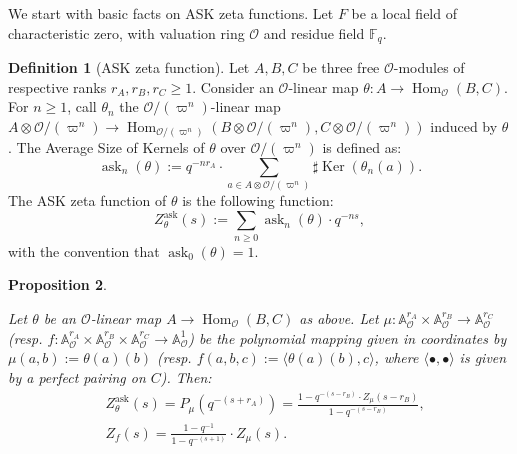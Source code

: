 \documentclass[11pt,english]{article}
\numberwithin{equation}{section}
\numberwithin{figure}{section}
\theoremstyle{definition}
\newtheorem{df}{Definition}[subsection]
\theoremstyle{plain}
\newtheorem{prop}[df]{Proposition}
\theoremstyle{remark}
\DeclareMathOperator{\Ker}{Ker}
\DeclareMathOperator{\Hom}{Hom}
\DeclareMathOperator{\ask}{ask}
\newcommand\FF{\mathbb{F}}
\begin{document}
We start with basic facts on ASK zeta functions. Let $F$ be a local
field of characteristic zero, with valuation ring $\mathcal{O}$ and
residue field $\FF_{q}$.

\begin{df}[ASK zeta function]

Let $A,B,C$ be three free $\mathcal{O}$-modules of respective ranks
$r_{A},r_{B},r_{C}\geq1$. Consider an $\mathcal{O}$-linear map $\theta:A\rightarrow\Hom_{\mathcal{O}}(B,C)$.
For $n\geq1$, call $\theta_{n}$ the $\mathcal{O}/(\varpi^{n})$-linear
map $A\otimes\mathcal{O}/(\varpi^{n})\rightarrow\Hom_{\mathcal{O}/(\varpi^{n})}(B\otimes\mathcal{O}/(\varpi^{n}),C\otimes\mathcal{O}/(\varpi^{n}))$
induced by $\theta$. The Average Size of Kernels of $\theta$ over
$\mathcal{O}/(\varpi^{n})$ is defined as:\[
\ask_n(\theta):=q^{-nr_A}\cdot\sum_{a\in A\otimes\mathcal{O}/(\varpi^n)}\sharp\Ker(\theta_n(a)).
\]The ASK zeta function of $\theta$ is the following function:\[
Z_{\theta}^{\ask}(s):=\sum_{n\geq0}\ask_n(\theta)\cdot q^{-ns},
\]with the convention that $\ask_{0}(\theta)=1$.

\end{df}

\begin{prop} \label{Prop/ASKvsIgusa}

Let $\theta$ be an $\mathcal{O}$-linear map $A\rightarrow\Hom_{\mathcal{O}}(B,C)$
as above. Let $\mu:\mathbb{A}_{\mathcal{O}}^{r_{A}}\times\mathbb{A}_{\mathcal{O}}^{r_{B}}\rightarrow\mathbb{A}_{\mathcal{O}}^{r_{C}}$
(resp. $f:\mathbb{A}_{\mathcal{O}}^{r_{A}}\times\mathbb{A}_{\mathcal{O}}^{r_{B}}\times\mathbb{A}_{\mathcal{O}}^{r_{C}}\rightarrow\mathbb{A}_{\mathcal{O}}^{1}$)
be the polynomial mapping given in coordinates by $\mu(a,b):=\theta(a)(b)$
(resp. $f(a,b,c):=\langle\theta(a)(b),c\rangle$, where $\langle\bullet,\bullet\rangle$
is given by a perfect pairing on $C$). Then:\begin{align*}
& Z_{\theta}^{\ask}(s)=P_\mu(q^{-(s+r_A)})=\frac{1-q^{-(s-r_B)}\cdot Z_{\mu}(s-r_B)}{1-q^{-(s-r_B)}}, \\
& Z_{f}(s)=\frac{1-q^{-1}}{1-q^{-(s+1)}}\cdot Z_{\mu}(s).
\end{align*}

\end{prop}
\end{document}
